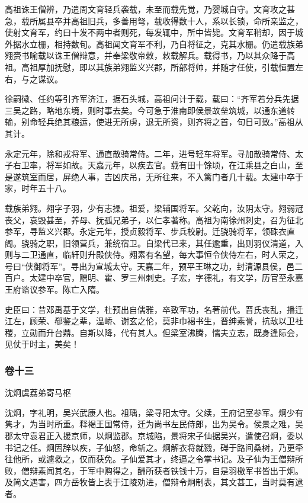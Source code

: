\documentclass[]{article}
\begin{document}
高祖诛王僧辨，乃遣周文育轻兵袭载，未至而载先觉，乃婴城自守。文育攻之甚急，载所属县卒并高祖旧兵，多善用弩，载收得数十人，系以长锁，命所亲监之，使射文育军，约曰十发不两中者则死，每发辄中，所中皆毙。文育军稍却，因于城外据水立栅，相持数旬。高祖闻文育军不利，乃自将征之，克其水栅。仍遣载族弟翙赍书喻载以诛王僧辩意，并奉梁敬帝敕，敕载解兵。载得书，乃以其众降于高祖。高祖厚加抚慰，即以其族弟翙监义兴郡，所部将帅，并随才任使，引载恒置左右，与之谋议。

徐嗣徽、任约等引齐军济江，据石头城，高祖问计于载，载曰：``齐军若分兵先据三吴之路，略地东境，则时事去矣。今可急于淮南即侯景故垒筑城，以通东道转输，别命轻兵绝其粮运，使进无所虏，退无所资，则齐将之首，旬日可致。''高祖从其计。

永定元年，除和戎将军、通直散骑常侍。二年，进号轻车将军。寻加散骑常侍、太子右卫率，将军如故。天嘉元年，以疾去官。载有田十馀顷，在江乘县之白山，至是遂筑室而居，屏绝人事，吉凶庆吊，无所往来，不入篱门者几十载。太建中卒于家，时年五十八。

载族弟翙。翙字子羽，少有志操。祖爱，梁辅国将军。父乾向，汝阴太守。翙弱冠丧父，哀毁甚至，养母、抚孤兄弟子，以仁孝著称。高祖为南徐州刺史，召为征北参军，寻监义兴郡。永定元年，授贞毅将军、步兵校尉。迁骁骑将军，领硃衣直阁。骁骑之职，旧领营兵，兼统宿卫。自梁代已来，其任逾重，出则羽仪清道，入则与二卫通直，临轩则升殿侠侍。翙素有名望，每大事恒令侠侍左右，时人荣之，号曰``侠御将军''。寻出为宣城太守。天嘉二年，预平王琳之功，封清源县侯，邑二百户。太建中卒官，赠明、霍、罗三州刺史。子宏，字德礼，有文学，历官至永嘉王府谘议参军。陈亡入隋。

史臣曰：昔邓禹基于文学，杜预出自儒雅，卒致军功，名著前代。晋氏丧乱，播迁江左，顾荣、郗鉴之辈，温峤、谢玄之伦，莫非巾褐书生，晋绅素誉，抗敌以卫社稷，立勋而升台鼎。自斯以降，代有其人。但梁室沸腾，懦夫立志，既身逢际会，见仗于时主，美矣！

\hypertarget{header-n4587}{%
\subsubsection{卷十三}\label{header-n4587}}

沈炯虞荔弟寄马枢

沈炯，字礼明，吴兴武康人也。祖瑀，梁寻阳太守。父续，王府记室参军。炯少有隽才，为当时所重。释褐王国常侍，迁为尚书左民侍郎，出为吴令。侯景之难，吴郡太守袁君正入援京师，以炯监郡。京城陷，景将宋子仙据吴兴，遣使召炯，委以书记之任。炯固辞以疾，子仙怒，命斩之。炯解衣将就戮，碍于路间桑树，乃更牵往他所，或遽救之，仅而获免。子仙爱其才，终逼之令掌书记。及子仙为王僧辩所败，僧辩素闻其名，于军中购得之，酬所获者铁钱十万，自是羽檄军书皆出于炯。及简文遇害，四方岳牧皆上表于江陵劝进，僧辩令炯制表，其文甚工，当时莫有逮者。
\end{document}
